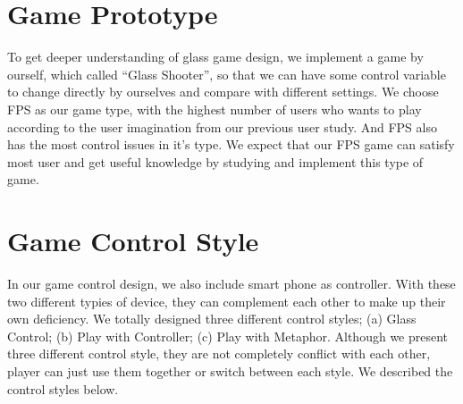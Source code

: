 \documentclass{sigchi}
\begin{document}


\section{Game Prototype}
To get deeper understanding of glass game design, we implement a game by ourself, which called ``Glass Shooter'', so that we can have some control variable to change directly by ourselves and compare with different settings. We choose FPS as our game type, with the highest number of users who wants to play according to the user imagination from our previous user study. And FPS also has the most control issues in it’s type. We expect that our FPS game can satisfy most user and get useful knowledge by studying and implement this type of game.

\section{Game Control Style}
In our game control design, we also include smart phone as controller. With these two different typies of device, they can complement each other to make up their own deficiency. We totally designed three different control styles; (a) Glass Control; (b) Play with Controller; (c) Play with Metaphor. Although we present three different control style, they are not completely conflict with each other, player can just use them together or switch between each style. We described the control styles below.
\end{document}
